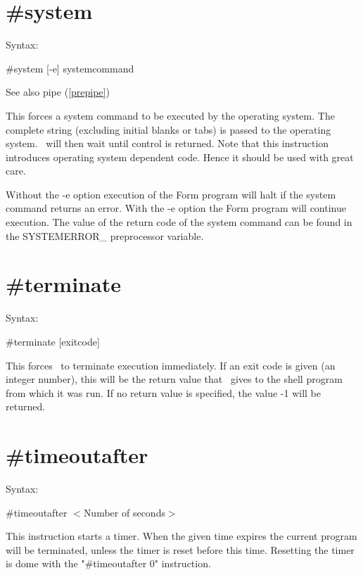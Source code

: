  
\section{\#system}
\label{presystem}

\noindent Syntax:

\#system [-e] systemcommand
 
\noindent See also pipe (\ref{prepipe})

\noindent This forces a system command to be executed by 
the operating system. The complete string (excluding initial blanks or 
tabs) is passed to the operating system. \FORM\ will then wait until control 
is returned. Note that this instruction introduces operating system 
dependent code. Hence it should be used with great care.

\noindent Without the -e option execution of the Form program will halt if 
the system command returns an error. With the -e option the Form program 
will continue execution. The value of the return code of the system command 
can be found in the SYSTEMERROR\_ preprocessor variable.

 
\section{\#terminate}
\label{preterminate}

\noindent Syntax:

\#terminate [exitcode]
 
\noindent This forces \FORM\ to terminate execution 
immediately. If an exit code is given (an integer number), this will be the 
return value that \FORM\ gives to the shell program from which it was run. If 
no return value is specified, the value -1 will be returned.

 
\section{\#timeoutafter}
\label{pretimeoutafter}

\noindent Syntax:

\#timeoutafter $<$Number of seconds$>$
 
\noindent This instruction starts a timer. When the given time expires the 
current program will be terminated, unless the timer is reset before this 
time. Resetting the timer is dome with the "\#timeoutafter 0" instruction.

